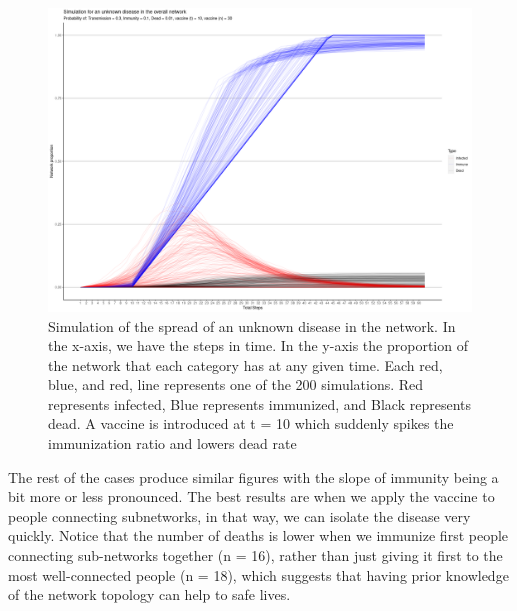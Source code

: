     \begin{figure}[h!]
        \centering
            \includegraphics[width=0.95\linewidth]{figures/Networks/Simulations/Simulation_Vaccine_30.png} 
        \caption{Simulation of the spread of an unknown disease in the network. In the x-axis, we have the steps in time. In the y-axis the proportion of the network that each category has at any given time. Each red, blue, and red, line represents one of the 200 simulations. Red represents infected, Blue represents immunized, and Black represents dead. A vaccine is introduced at t = 10 which suddenly spikes the immunization ratio and lowers dead rate}
        \label{figure:simulationsB}
    \end{figure}  

The rest of the cases produce similar figures with the slope of immunity being a bit more or less pronounced. The best results are when we apply the vaccine to people connecting subnetworks, in that way, we can isolate the disease very quickly. Notice that the number of deaths is lower when we immunize first people connecting sub-networks together (n = 16), rather than just giving it first to the most well-connected people (n = 18), which suggests that having prior knowledge of the network topology can help to safe lives.






